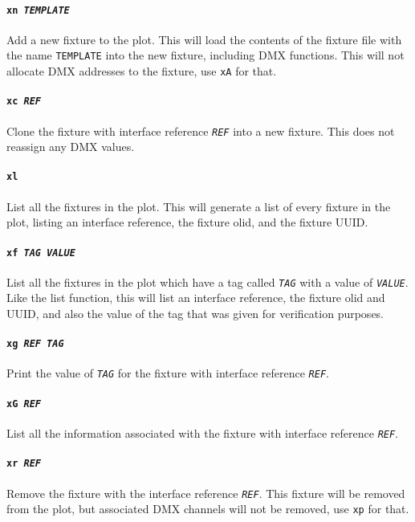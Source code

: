 \documentclass[a4paper]{article}
\begin{document}
\paragraph{\texttt{xn \textit{TEMPLATE}}}
Add a new fixture to the plot. This will load the contents of the fixture 
file with the name \texttt{TEMPLATE} into the new fixture, including DMX 
functions. This will not allocate DMX addresses to the fixture, use 
\texttt{xA} for that.

\paragraph{\texttt{xc \textit{REF}}}
Clone the fixture with interface reference \texttt{\textit{REF}} into a new 
fixture. This does not reassign any DMX values.

\paragraph{\texttt{xl}}
List all the fixtures in the plot. This will generate a list of every fixture 
in the plot, listing an interface reference, the fixture olid, and the fixture 
UUID.

\paragraph{\texttt{xf \textit{TAG VALUE}}}
List all the fixtures in the plot which have a tag called 
\texttt{\textit{TAG}} with a value of \texttt{\textit{VALUE}}. Like the list 
function, this will list an interface reference, the fixture olid and UUID, 
and also the value of the tag that was given for verification purposes.

\paragraph{\texttt{xg \textit{REF TAG}}}
Print the value of \texttt{\textit{TAG}} for the fixture with interface
reference \texttt{\textit{REF}}.

\paragraph{\texttt{xG \textit{REF}}}
List all the information associated with the fixture with interface reference 
\texttt{\textit{REF}}.

\paragraph{\texttt{xr \textit{REF}}}
Remove the fixture with the interface reference \texttt{\textit{REF}}. This 
fixture will be removed from the plot, but associated DMX channels will not be 
removed, use \texttt{xp} for that.
\end{document}
